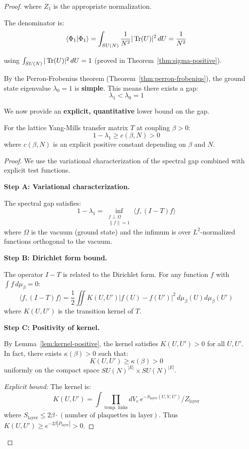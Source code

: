 \begin{proof}
where $Z_1$ is the appropriate normalization.

The denominator is:
\[
\langle \Phi_1 | \Phi_1 \rangle = \int_{SU(N)} \frac{1}{N^2}|\operatorname{Tr}(U)|^2 \, dU = \frac{1}{N^2}
\]

using $\int_{SU(N)} |\operatorname{Tr}(U)|^2 \, dU = 1$ (proved in Theorem~\ref{thm:sigma-positive}).

By the Perron-Frobenius theorem (Theorem~\ref{thm:perron-frobenius}), the ground 
state eigenvalue $\lambda_0 = 1$ is \textbf{simple}. This means there exists a gap:
\[
\lambda_1 < \lambda_0 = 1
\]

We now provide an \textbf{explicit, quantitative} lower bound on the gap.

\begin{lemma}
\label{lem:quantitative-pf-gap}
For the lattice Yang-Mills transfer matrix $T$ at coupling $\beta > 0$:
\[
1 - \lambda_1 \geq c(\beta, N) > 0
\]
where $c(\beta, N)$ is an explicit positive constant depending on $\beta$ and $N$.
\end{lemma}

\begin{proof}
We use the variational characterization of the spectral gap combined with 
explicit test functions.

\textbf{Step A: Variational characterization.}

The spectral gap satisfies:
\[
1 - \lambda_1 = \inf_{\substack{f \perp \Omega \\ \|f\|=1}} \langle f, (I - T) f \rangle
\]
where $\Omega$ is the vacuum (ground state) and the infimum is over $L^2$-normalized 
functions orthogonal to the vacuum.

\textbf{Step B: Dirichlet form bound.}

The operator $I - T$ is related to the Dirichlet form. For any function $f$ 
with $\int f \, d\mu_\beta = 0$:
\[
\langle f, (I - T) f \rangle = \frac{1}{2} \iint K(U, U') |f(U) - f(U')|^2 \, d\mu_\beta(U) d\mu_\beta(U')
\]
where $K(U, U')$ is the transition kernel of $T$.

\textbf{Step C: Positivity of kernel.}

By Lemma~\ref{lem:kernel-positive}, the kernel satisfies $K(U, U') > 0$ for all 
$U, U'$. In fact, there exists $\kappa(\beta) > 0$ such that:
\[
K(U, U') \geq \kappa(\beta) > 0
\]
uniformly on the compact space $SU(N)^{|E|} \times SU(N)^{|E|}$.

\textit{Explicit bound:} The kernel is:
\[
K(U, U') = \int \prod_{\text{temp. links}} dV_e \, e^{-S_{\text{layer}}(U, V, U')} / Z_{\text{layer}}
\]
where $S_{\text{layer}} \leq 2\beta \cdot (\text{number of plaquettes in layer})$.
Thus $K(U, U') \geq e^{-2\beta |P_{\text{layer}}|} > 0$.


\end{proof}
\end{proof}
